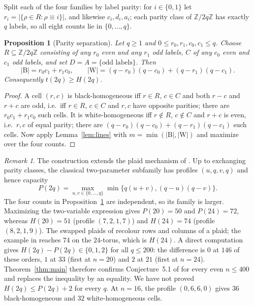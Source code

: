 \documentclass[11pt]{amsart}
\newtheorem{proposition}[theorem]{Proposition}
\theoremstyle{definition}
\theoremstyle{remark}
\newtheorem{remark}[theorem]{Remark}
\newcommand{\Z}{\mathbb{Z}}
\newcommand{\Bl}{\mathrm{B}}
\newcommand{\Wh}{\mathrm{W}}
\begin{document}
Split each of the four families by label parity: for $i\in\{0,1\}$ let $r_i=|\{\rho\in R:\rho\equiv i\}|$, and likewise $c_i,d_i,a_i$; each parity class of $\Z/2q\Z$ has exactly $q$ labels, so all eight counts lie in $\{0,\dots,q\}$.

\begin{proposition}[Parity separation]\label{prop:lower}
Let $q\ge1$ and $0\le r_0,r_1,c_0,c_1\le q$. Choose $R\subseteq\Z/2q\Z$ consisting of any $r_0$ even and any $r_1$ odd labels, $C$ of any $c_0$ even and $c_1$ odd labels, and set $D=A=\{\text{odd labels}\}$. Then
\[
|\Bl|=r_0c_1+r_1c_0,
\qquad
|\Wh|=(q-r_0)(q-c_0)+(q-r_1)(q-c_1).
\]
Consequently $t(2q)\ge H(2q)$.
\end{proposition}

\begin{proof}
A cell $(r,c)$ is black-homogeneous iff $r\in R$, $c\in C$ and both $r-c$ and $r+c$ are odd, i.e.\ iff $r\in R$, $c\in C$ and $r,c$ have opposite parities; there are $r_0c_1+r_1c_0$ such cells. It is white-homogeneous iff $r\notin R$, $c\notin C$ and $r+c$ is even, i.e.\ $r,c$ of equal parity; there are $(q-r_0)(q-c_0)+(q-r_1)(q-c_1)$ such cells. Now apply Lemma~\ref{lem:lines} with $m=\min(|\Bl|,|\Wh|)$ and maximize over the four counts.
\end{proof}

\begin{remark}\label{rem:plaid16}
The construction extends the plaid mechanism of \cite[\S3]{CDHS24}.
Up to exchanging parity classes, the classical two-parameter subfamily has
profiles $(u,q,v,q)$ and hence capacity
\[
P(2q)=\max_{u,v\in\{0,\ldots,q\}}\min\{q(u+v),(q-u)(q-v)\}.
\]
The four counts in Proposition~\ref{prop:lower} are independent, so its
family is larger.  Maximizing the two-variable expression gives $P(20)=50$
and $P(24)=72$, whereas $H(20)=51$ (profile $(7,2,1,7)$) and $H(24)=74$
(profile $(8,2,1,9)$).  The swapped plaids of \cite[\S5]{CDHS24} recolour
rows and columns of a plaid; the example in \cite[Figure~6]{CDHS24} reaches
$74$ on the $24$-torus, which is $H(24)$.  A direct computation gives
$H(2q)-P(2q)\in\{0,1,2\}$ for all $q\le200$: the difference is $0$ at
$146$ of these orders, $1$ at $33$ (first at $n=20$) and $2$ at $21$ (first
at $n=24$).  Theorem~\ref{thm:main} therefore confirms Conjecture~5.1 of
\cite{CDHS24} for every even $n\le400$ and replaces the inequality by an
equality.  We have not proved $H(2q)\le P(2q)+2$ for every $q$.
At $n=16$, the profile $(0,6,6,0)$ gives $36$ black-homogeneous and $32$
white-homogeneous cells.
\end{remark}
\end{document}
